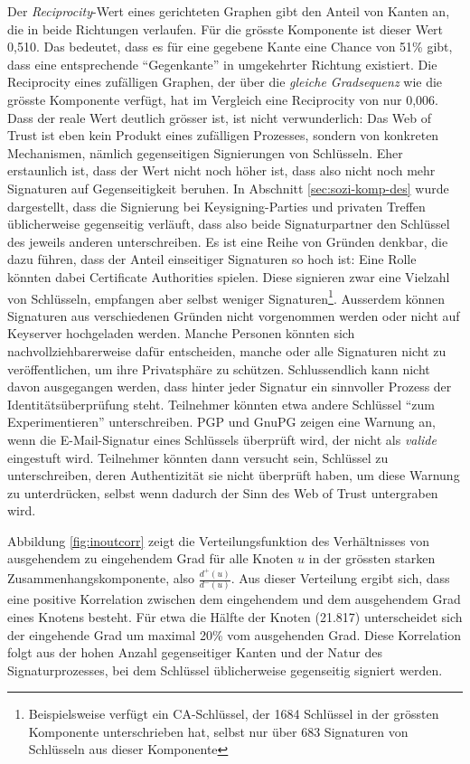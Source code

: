 Der \emph{Reciprocity}-Wert eines gerichteten Graphen gibt den Anteil
von Kanten an, die in beide Richtungen verlaufen. F\"ur die gr\"osste
Komponente ist dieser Wert 0,510. Das bedeutet, dass es f\"ur eine
gegebene Kante eine Chance von 51\% gibt, dass eine entsprechende
``Gegenkante'' in umgekehrter Richtung existiert. Die Reciprocity
eines zuf\"alligen Graphen, der \"uber die \emph{gleiche Gradsequenz}
wie die gr\"osste Komponente verf\"ugt, hat im Vergleich eine
Reciprocity von nur 0,006. Dass der reale Wert deutlich gr\"osser ist,
ist nicht verwunderlich: Das Web of Trust ist eben kein Produkt eines
zuf\"alligen Prozesses, sondern von konkreten Mechanismen, n\"amlich
gegenseitigen Signierungen von Schl\"usseln. Eher erstaunlich ist,
dass der Wert nicht noch h\"oher ist, dass also nicht noch mehr
Signaturen auf Gegenseitigkeit beruhen. In Abschnitt
\ref{sec:sozi-komp-des} wurde dargestellt, dass die Signierung bei
Keysigning-Parties und privaten Treffen \"ublicherweise gegenseitig
verl\"auft, dass also beide Signaturpartner den Schl\"ussel des
jeweils anderen unterschreiben. Es ist eine Reihe von Gr\"unden
denkbar, die dazu f\"uhren, dass der Anteil einseitiger Signaturen so
hoch ist: Eine Rolle k\"onnten dabei Certificate Authorities
spielen. Diese signieren zwar eine Vielzahl von Schl\"usseln,
empfangen aber selbst weniger Signaturen\footnote{Beispielsweise
  verf\"ugt ein CA-Schl\"ussel, der 1684 Schl\"ussel in der gr\"ossten
  Komponente unterschrieben hat, selbst nur \"uber 683 Signaturen von
  Schl\"usseln aus dieser Komponente}. Ausserdem k\"onnen Signaturen
aus verschiedenen Gr\"unden nicht vorgenommen werden oder nicht auf
Keyserver hochgeladen werden. Manche Personen k\"onnten sich
nachvollziehbarerweise daf\"ur entscheiden, manche oder alle
Signaturen nicht zu ver\"offentlichen, um ihre Privatsph\"are zu
sch\"utzen. Schlussendlich kann nicht davon ausgegangen werden, dass
hinter jeder Signatur ein sinnvoller Prozess der
Identit\"ats\"uberpr\"ufung steht. Teilnehmer k\"onnten etwa andere
Schl\"ussel ``zum Experimentieren'' unterschreiben. PGP und GnuPG
zeigen eine Warnung an, wenn die E-Mail-Signatur eines Schl\"ussels
\"uberpr\"uft wird, der nicht als \emph{valide} eingestuft
wird. Teilnehmer k\"onnten dann versucht sein, Schl\"ussel zu
unterschreiben, deren Authentizit\"at sie nicht \"uberpr\"uft haben,
um diese Warnung zu unterdr\"ucken, selbst wenn dadurch der Sinn des
Web of Trust untergraben wird.

Abbildung \ref{fig:inoutcorr} zeigt die Verteilungsfunktion des
Verh\"altnisses von ausgehendem zu eingehendem Grad f\"ur alle Knoten
$u$ in der gr\"ossten starken Zusammenhangskomponente, also
$\frac{d^+(u)}{d^-(u)}$. Aus dieser Verteilung ergibt sich, dass eine
positive Korrelation zwischen dem eingehendem und dem ausgehendem Grad
eines Knotens besteht. F\"ur etwa die H\"alfte der Knoten (21.817)
unterscheidet sich der eingehende Grad um maximal 20\% vom ausgehenden
Grad. Diese Korrelation folgt aus der hohen Anzahl gegenseitiger
Kanten und der Natur des Signaturprozesses, bei dem Schl\"ussel
\"ublicherweise gegenseitig signiert werden.

